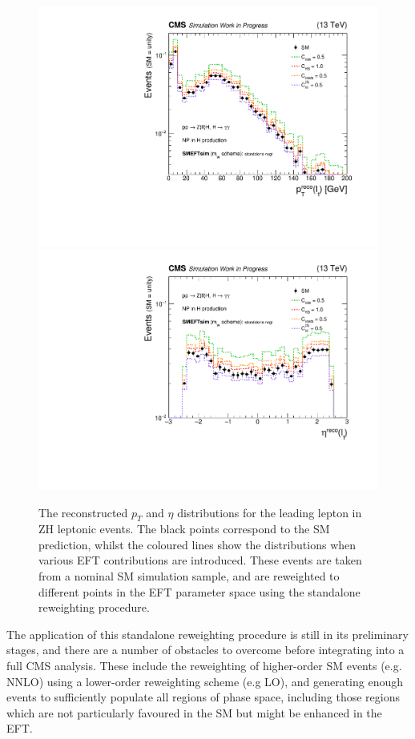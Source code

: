 \begin{figure}[htb!]
  \centering
  \includegraphics[width=.49\textwidth]{Figures/eft/distributions/lep_pt_nanoaod.pdf}
  \includegraphics[width=.49\textwidth]{Figures/eft/distributions/lep_eta_nanoaod.pdf}
  \caption[Standalone reweighting of ZH leptonic events]
  {
    The reconstructed $p_T$ and $\eta$ distributions for the leading lepton in ZH leptonic events. The black points correspond to the SM prediction, whilst the coloured lines show the distributions when various EFT contributions are introduced. These events are taken from a nominal SM simulation sample, and are reweighted to different points in the EFT parameter space using the standalone reweighting procedure.
  }
  \label{fig:standalone_rwgt}
\end{figure}

The application of this standalone reweighting procedure is still in its preliminary stages, and there are a number of obstacles to overcome before integrating into a full CMS analysis. These include the reweighting of higher-order SM events (e.g. NNLO) using a lower-order reweighting scheme (e.g LO), and generating enough events to sufficiently populate all regions of phase space, including those regions which are not particularly favoured in the SM but might be enhanced in the EFT.


